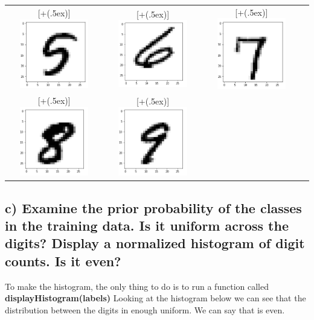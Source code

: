 \documentclass[11pt,letterpaper]{article}
\newcommand*{\addheight}[2][.5ex]{%
  \raisebox{0pt}[\dimexpr\height+(#1)\relax]{#2}%
}
\begin{document}
\begin{tabular}{|c|c|c|c|}
      \addheight{\includegraphics[width=30mm]{img/1-b/5.png}} &
      \addheight{\includegraphics[width=30mm]{img/1-b/6.png}} &
      \addheight{\includegraphics[width=30mm]{img/1-b/7.png}} \\
      \addheight{\includegraphics[width=30mm]{img/1-b/8.png}} &
      \addheight{\includegraphics[width=30mm]{img/1-b/9.png}} \\
      \hline
\end{tabular}

\newpage
\subsection{c) Examine the prior probability of the classes in the training data. Is it uniform across the digits? Display a normalized histogram of digit counts. Is it even?}
To make the histogram, the only thing to do is to run a function called \textbf{displayHistogram(labels)}
Looking at the histogram below we can see that the distribution between the digits in enough uniform. We can say that is even.
\end{document}

